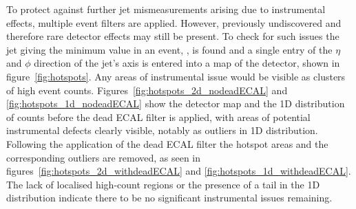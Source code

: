 To protect against further jet mismeasurements arising due to
instrumental effects, multiple event filters are applied. However, previously
undiscovered and therefore rare detector effects may still be
present. To check for such issues the
jet giving the minimum \dphistar value in an event, \mindphistar, is found
and a single entry of the $\eta$ and $\phi$ direction of the jet's axis is entered
into a map of the detector, shown in figure~\ref{fig:hotspots}. Any areas of
instrumental issue would
be visible as clusters of high event counts.
Figures~\ref{fig:hotspots_2d_nodeadECAL} and \ref{fig:hotspots_1d_nodeadECAL}
show the detector map and the 1D distribution
of counts before the dead ECAL filter is applied, with areas of
potential instrumental defects clearly visible, notably as outliers in
1D distribution. Following the application of the dead
ECAL filter the hotspot areas and the corresponding outliers are removed, as
seen in figures~\ref{fig:hotspots_2d_withdeadECAL} and
\ref{fig:hotspots_1d_withdeadECAL}. The lack of localised high-count regions or
the presence of a tail in the 1D distribution indicate there to be
no significant instrumental issues remaining.

